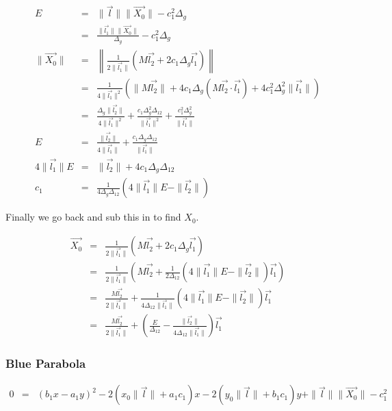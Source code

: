 \documentclass{article}
\begin{document}
\begin{eqnarray}
E & = & \|\vec{l}\|\|\vec{X_0}\| - c_1^2\Delta_g\\
  & = & \frac{\|\vec{l_1}\|\|\vec{X_0}\|}{\Delta_g} - c_1^2\Delta_g\\
\|\vec{X_0}\| & = & \left\|\frac{1}{2\|\vec{l_1}\|}\left( M\vec{l_2} + 2c_1\Delta_g\vec{l_1} \right)\right\|\\
              & = & \frac{1}{4\|\vec{l_1}\|^2}\left( \|M\vec{l_2}\| + 4c_1\Delta_g(M\vec{l_2}\cdot\vec{l_1})  + 4c_1^2\Delta_g^2\|\vec{l_1}\| \right)\\
              & = & \frac{\Delta_g\|\vec{l_2}\|}{4\|\vec{l_1}\|^2} + \frac{c_1\Delta_g^2\Delta_{12}}{\|\vec{l_1}\|^2}  + \frac{c_1^2\Delta_g^2}{\|\vec{l_1}\|}\\
E & = & \frac{\|\vec{l_2}\|}{4\|\vec{l_1}\|} + \frac{c_1\Delta_g\Delta_{12}}{\|\vec{l_1}\|}\\
4\|\vec{l_1}\|E & = & \|\vec{l_2}\| + 4c_1\Delta_g\Delta_{12}\\
c_1 & = & \frac{1}{4\Delta_g\Delta_{12}}\left(4\|\vec{l_1}\|E - \|\vec{l_2}\|\right)
\end{eqnarray}

Finally we go back and sub this in to find $X_0$.

\begin{eqnarray}
\vec{X_0} & = & \frac{1}{2\|\vec{l_1}\|}\left( M\vec{l_2} + 2c_1\Delta_g\vec{l_1} \right)\\
          & = & \frac{1}{2\|\vec{l_1}\|}\left( M\vec{l_2} + \frac{1}{2\Delta_{12}}\left(4\|\vec{l_1}\|E - \|\vec{l_2}\|\right) \vec{l_1} \right)\\
          & = & \frac{M\vec{l_2}}{2\|\vec{l_1}\|} + \frac{1}{4\Delta_{12}\|\vec{l_1}\|}\left(4\|\vec{l_1}\|E - \|\vec{l_2}\|\right) \vec{l_1}\\
          & = & \frac{M\vec{l_2}}{2\|\vec{l_1}\|} + \left(\frac{E}{\Delta_{12}} - \frac{\|\vec{l_2}\|}{4\Delta_{12}\|\vec{l_1}\|}\right) \vec{l_1}
\end{eqnarray}

\subsubsection{Blue Parabola}

\begin{eqnarray}
0  & = & (b_1x - a_1y)^2 -  2(x_0\|\vec{l}\| + a_1c_1)x - 2(y_0\|\vec{l}\| + b_1c_1)y + \|\vec{l}\|\|\vec{X_0}\| - c_1^2\nonumber
\end{eqnarray}
\end{document}
